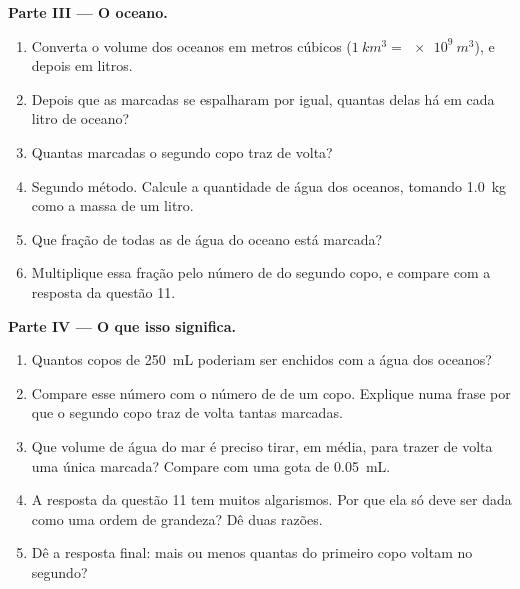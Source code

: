 \begin{problem}
\medskip
\noindent\textbf{Parte III --- O oceano.}
\begin{enumerate}[resume]
  \item Converta o volume dos oceanos em metros cúbicos
        ($\qty{1}{km^3} = \qty{e9}{m^3}$), e depois em litros.
  \item Depois que as  marcadas se espalharam por igual, quantas
        delas há em cada litro de oceano?
  \item Quantas  marcadas o segundo copo traz de volta?
  \item Segundo método. Calcule a quantidade de água dos oceanos, tomando
        \qty{1.0}{kg} como a massa de um litro.
  \item Que fração de todas as  de água do oceano está marcada?
  \item Multiplique essa fração pelo número de  do segundo copo,
        e compare com a resposta da questão 11.
\end{enumerate}

\medskip
\noindent\textbf{Parte IV --- O que isso significa.}
\begin{enumerate}[resume]
  \item Quantos copos de \qty{250}{mL} poderiam ser enchidos com a água
        dos oceanos?
  \item Compare esse número com o número de  de um copo.
        Explique numa frase por que o segundo copo traz de volta tantas
         marcadas.
  \item Que volume de água do mar é preciso tirar, em média, para trazer
        de volta uma única  marcada? Compare com uma gota de
        \qty{0.05}{mL}.
  \item A resposta da questão 11 tem muitos algarismos. Por que ela só
        deve ser dada como uma ordem de grandeza? Dê duas razões.
  \item Dê a resposta final: mais ou menos quantas  do primeiro
        copo voltam no segundo?
\end{enumerate}
\end{problem}
